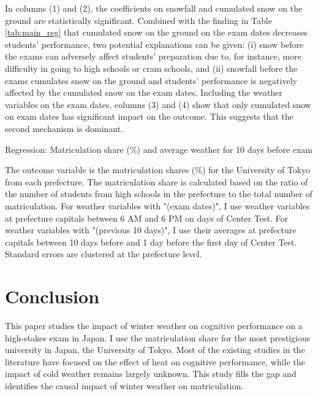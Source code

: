 \documentclass[12pt,letterpaper]{article}
\begin{document}
In columns (1) and (2), the coefficients on snowfall and cumulated snow on the ground are statistically significant.
Combined with the finding in Table \ref{tab:main_reg} that cumulated snow on the ground on the exam dates decreases students' performance, two potential explanations can be given:
(i) snow before the exams can adversely affect students' preparation due to, for instance, more difficulty in going to high schools or cram schools, and
(ii) snowfall before the exams cumulates snow on the ground and students' performance is negatively affected by the cumulated snow on the exam dates.
Including the weather variables on the exam dates, columns (3) and (4) show that only cumulated snow on exam dates has significant impact on the outcome.
This suggests that the second mechanism is dominant.

\begin{table}[H]
  \center
  \caption{Regression: Matriculation share (\%) and average weather for 10 days before exam}
  \scriptsize
  
  \label{tab:reg_pre10}
  \scriptsize
  \begin{tablenotes}
    \item
      The outcome variable is the matriculation shares (\%) for the University of Tokyo from each prefecture.
      The matriculation share is calculated based on the ratio of the number of students from high schools in the prefecture to the total number of matriculation.
      For weather variables with "(exam dates)", I use weather variables at prefecture capitals between 6 AM and 6 PM on days of Center Test.
      For weather variables with "(previous 10 days)", I use their averages at prefecture capitals between 10 days before and 1 day before the first day of Center Test.
      Standard errors are clustered at the prefecture level.
  \end{tablenotes}
\end{table}

\section{Conclusion}\label{sec:conclusion}

This paper studies the impact of winter weather on cognitive performance on a high-stakes exam in Japan.
I use the matriculation share for the most prestigious university in Japan, the University of Tokyo.
Most of the existing studies in the literature have focused on the effect of heat on cognitive performance, while the impact of cold weather remains largely unknown.
This study fills the gap and identifies the causal impact of winter weather on matriculation.
\end{document}
